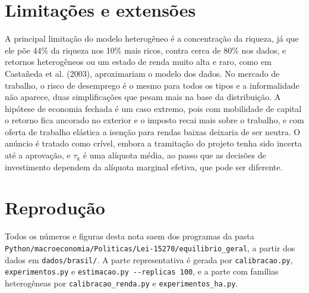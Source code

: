 \documentclass[11pt,a4paper]{article}
\begin{document}
\section{Limitações e extensões}
\label{sec:limites}

A principal limitação do modelo heterogêneo é a concentração da riqueza, já
que ele põe 44\% da riqueza nos 10\% mais ricos, contra cerca de 80\% nos
dados, e retornos heterogêneos ou um estado de renda muito alta e raro, como
em Castañeda et al. (2003), aproximariam o modelo dos dados. No mercado de
trabalho, o risco de desemprego é o mesmo para todos os tipos e a
informalidade não aparece, duas simplificações que pesam mais na base da
distribuição. A hipótese de economia fechada é um caso extremo, pois com
mobilidade de capital o retorno fica ancorado no exterior e o imposto recai
mais sobre o trabalho, e com oferta de trabalho elástica a isenção para rendas
baixas deixaria de ser neutra. O anúncio é tratado como crível, embora a
tramitação do projeto tenha sido incerta até a aprovação, e $\tau_k$ é uma
alíquota média, ao passo que as decisões de investimento dependem da alíquota
marginal efetiva, que pode ser diferente.

\section*{Reprodução}
Todos os números e figuras desta nota saem dos programas da pasta
\nolinkurl{Python/macroeconomia/Politicas/Lei-15270/equilibrio_geral}, a
partir dos dados em \nolinkurl{dados/brasil/}. A parte representativa é
gerada por \texttt{calibracao.py}, \texttt{experimentos.py} e
\texttt{estimacao.py -{}-replicas 100}, e a parte com famílias heterogêneas
por \texttt{calibracao\_renda.py} e \texttt{experimentos\_ha.py}.
\end{document}
